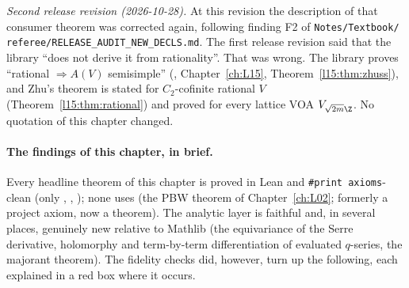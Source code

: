 \emph{Second release revision (2026-10-28).} At this revision the description of
that consumer theorem was corrected again, following finding F2 of \texttt{Notes/\allowbreak Textbook/\allowbreak
referee/\allowbreak RELEASE\_AUDIT\_NEW\_DECLS.md}. The first release revision said that the library ``does not derive it from
rationality''. That was wrong. The library proves ``rational $\Rightarrow A(V)$ semisimple''
(\allowbreak{}\allowbreak{}, Chapter~\ref{ch:L15},
Theorem~\ref{l15:thm:zhuss}), and Zhu's theorem is stated for $C_2$-cofinite rational $V$
(Theorem~\ref{l15:thm:rational}) and proved for every lattice VOA $V_{\sqrt{2m}\Z}$. No quotation of this chapter changed.

\paragraph{The findings of this chapter, in brief.} Every headline theorem of this chapter is proved in Lean and
\texttt{\#print axioms}-clean (only , , ); none uses  (the PBW theorem of Chapter~\ref{ch:L02}; formerly a project axiom, now a theorem). The analytic layer is faithful and, in several places, genuinely new relative to Mathlib (the
equivariance of the Serre derivative, holomorphy and term-by-term differentiation of evaluated $q$-series, the majorant
theorem). The fidelity checks did, however, turn up the following, each explained in a red box where it occurs.
